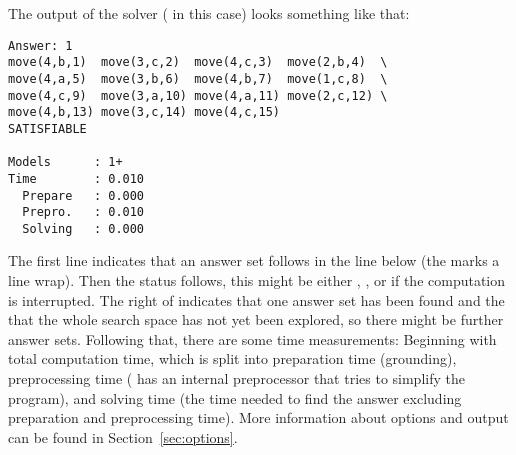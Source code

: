 The output of the solver (\clingo{} in this case) looks something like that:
\begin{lstlisting}[numbers=none]
Answer: 1
move(4,b,1)  move(3,c,2)  move(4,c,3)  move(2,b,4)  \
move(4,a,5)  move(3,b,6)  move(4,b,7)  move(1,c,8)  \
move(4,c,9)  move(3,a,10) move(4,a,11) move(2,c,12) \
move(4,b,13) move(3,c,14) move(4,c,15) 
SATISFIABLE

Models      : 1+    
Time        : 0.010
  Prepare   : 0.000
  Prepro.   : 0.010
  Solving   : 0.000
\end{lstlisting}
The first line indicates that an answer set follows in the line below (the \code{\textbackslash} marks a line wrap).
Then the status follows, this might be either , , or  
if the computation is interrupted.
The \code{1+} right of \code{Models:} indicates that one answer set has been found and the \code{+} that 
the whole search space has not yet been explored, so there might be further answer sets.
Following that, there are some time measurements: 
Beginning with total computation time, 
which is split into 
preparation time (grounding), 
preprocessing time (\clasp{} has an internal preprocessor that tries to simplify the program), 
and solving time (the time needed to find the answer excluding preparation and preprocessing time).
More information about options and output can be found in Section~\ref{sec:options}.